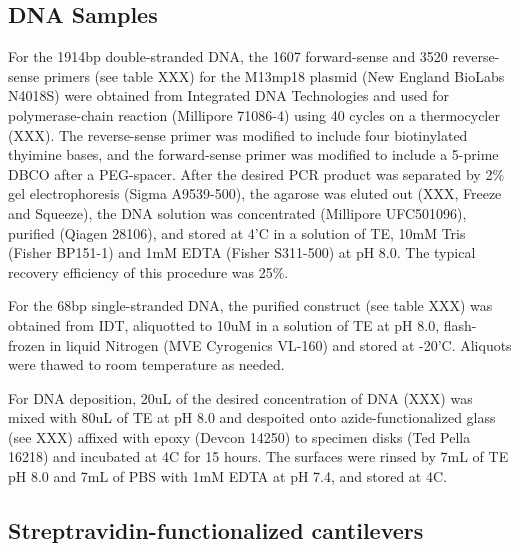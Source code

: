 \documentclass[%
  aip,12pt,tightenlines,
  amsthm,
 amsmath,amssymb,
 reprint,%
]{revtex4-1}
\newcommand{\sLabel}[1]{\label{section:#1}}
\newcommand{\firstp}[0]{\noindent}
\newcommand{\pl}[0]{\vspace{6pt}}
\newcommand{\supply}[2]{(#1 #2)}
\begin{document}
\subsection{\sLabel{Sample}DNA Samples}

\firstp For the 1914bp double-stranded DNA, the 1607 forward-sense and 3520 reverse-sense primers (see table XXX) for the M13mp18 plasmid \supply{New England BioLabs}{N4018S} were obtained from Integrated DNA Technologies  and used for polymerase-chain reaction \supply{Millipore}{71086-4} using 40 cycles on a thermocycler (XXX). The reverse-sense primer was modified to include four biotinylated thyimine bases, and the forward-sense primer was modified to include a 5-prime DBCO after a PEG-spacer. After the desired PCR product was separated by 2\% gel electrophoresis \supply{Sigma}{A9539-500}, the agarose was eluted out (XXX, Freeze and Squeeze), the DNA solution was concentrated \supply{Millipore}{UFC501096}, purified \supply{Qiagen}{28106}, and stored at 4'C in a solution of TE, 10mM Tris \supply{Fisher}{BP151-1} and 1mM EDTA \supply{Fisher}{S311-500} at pH 8.0. The typical recovery efficiency of this procedure was 25\%. \pl 

For the 68bp single-stranded DNA, the purified construct (see table XXX) was obtained from IDT, aliquotted to 10uM in a solution of TE at pH 8.0, flash-frozen in liquid Nitrogen \supply{MVE Cyrogenics}{VL-160} and stored at -20'C. Aliquots were thawed to room temperature as needed. \pl 

For DNA deposition, 20uL of the desired concentration of DNA (XXX) was mixed with 80uL of TE at pH 8.0 and despoited onto azide-functionalized glass (see XXX) affixed with epoxy \supply{Devcon}{14250} to specimen disks \supply{Ted Pella}{16218} and incubated at 4C for 15 hours. The surfaces were rinsed by 7mL of TE pH 8.0 and 7mL of PBS with 1mM EDTA at pH 7.4, and stored at 4C. 

\subsection{\sLabel{Cantilevers}Streptravidin-functionalized cantilevers}
\end{document}
